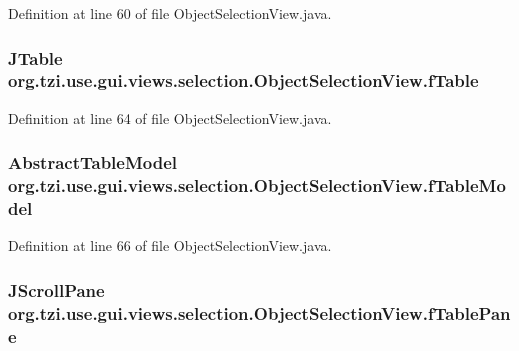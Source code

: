 Definition at line 60 of file Object\-Selection\-View.\-java.

\hypertarget{classorg_1_1tzi_1_1use_1_1gui_1_1views_1_1selection_1_1_object_selection_view_a065ac16beb47138d924fbe5764f93d9d}{
\subsubsection[{f\-Table}]{\setlength{\rightskip}{0pt plus 5cm}J\-Table org.\-tzi.\-use.\-gui.\-views.\-selection.\-Object\-Selection\-View.\-f\-Table}}\label{classorg_1_1tzi_1_1use_1_1gui_1_1views_1_1selection_1_1_object_selection_view_a065ac16beb47138d924fbe5764f93d9d}


Definition at line 64 of file Object\-Selection\-View.\-java.

\hypertarget{classorg_1_1tzi_1_1use_1_1gui_1_1views_1_1selection_1_1_object_selection_view_a5107a056025925e077fdbf075724b493}{
\subsubsection[{f\-Table\-Model}]{\setlength{\rightskip}{0pt plus 5cm}Abstract\-Table\-Model org.\-tzi.\-use.\-gui.\-views.\-selection.\-Object\-Selection\-View.\-f\-Table\-Model}}\label{classorg_1_1tzi_1_1use_1_1gui_1_1views_1_1selection_1_1_object_selection_view_a5107a056025925e077fdbf075724b493}


Definition at line 66 of file Object\-Selection\-View.\-java.

\hypertarget{classorg_1_1tzi_1_1use_1_1gui_1_1views_1_1selection_1_1_object_selection_view_aa539835a9ad95c1c94056c1d5b1e9719}{
\subsubsection[{f\-Table\-Pane}]{\setlength{\rightskip}{0pt plus 5cm}J\-Scroll\-Pane org.\-tzi.\-use.\-gui.\-views.\-selection.\-Object\-Selection\-View.\-f\-Table\-Pane}}\label{classorg_1_1tzi_1_1use_1_1gui_1_1views_1_1selection_1_1_object_selection_view_aa539835a9ad95c1c94056c1d5b1e9719}


